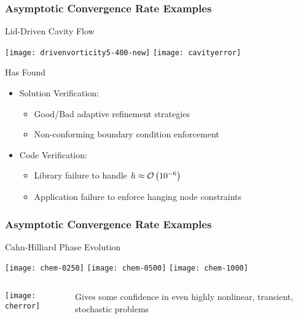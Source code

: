 \begin{frame}
\frametitle{Asymptotic Convergence Rate Examples}
\begin{block}{Lid-Driven Cavity Flow}
\begin{center}
\texttt{[image: drivenvorticity5-400-new]}
\;\;\;
\texttt{[image: cavityerror]}
\end{center}
\end{block}

\begin{block}{Has Found}
\begin{itemize}
\item Solution Verification:
\begin{itemize}
\item Good/Bad adaptive refinement strategies
\item Non-conforming boundary condition enforcement
\end{itemize}
\item Code Verification:
\begin{itemize}
\item Library failure to handle $h \approx  {\cal O}\left(10^{-6}\right)$
\item Application failure to enforce hanging node constraints
\end{itemize}
\end{itemize}
\end{block}

\end{frame}

\begin{frame}
\frametitle{Asymptotic Convergence Rate Examples}
\begin{block}{Cahn-Hilliard Phase Evolution}
\begin{center}
\texttt{[image: chem-0250]}
\;\;\;
\texttt{[image: chem-0500]}
\;\;\;
\texttt{[image: chem-1000]}
\end{center}
\end{block}

\begin{columns}
\begin{column}{.4\textwidth}
\begin{center}
\texttt{[image: cherror]}
\end{center}
\end{column}
\begin{column}{.6\textwidth}
Gives some confidence in even highly nonlinear, transient, stochastic problems
\end{column}
\end{columns}

\end{frame}

